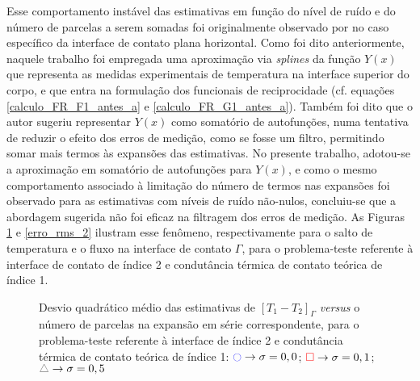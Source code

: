 Esse comportamento instável das estimativas em função do nível de ruído e do número de parcelas a serem somadas foi originalmente observado por \cite{tese_padilha} no caso específico da interface de contato plana horizontal. Como foi dito anteriormente, naquele trabalho foi empregada uma aproximação via \textit{splines} da função $Y(x)$ que representa as medidas experimentais de temperatura na interface superior do corpo, e que entra na formulação dos funcionais de reciprocidade (cf. equações \eqref{calculo_FR_F1_antes_a} e \eqref{calculo_FR_G1_antes_a}). Também foi dito que o autor sugeriu representar $Y(x)$ como somatório de autofunções, numa tentativa de reduzir o efeito dos erros de medição, como se fosse um filtro, permitindo somar mais termos às expansões das estimativas. No presente trabalho, adotou-se a aproximação em somatório de autofunções para $Y(x)$, e como o mesmo comportamento associado à limitação do número de termos nas expansões foi observado para as estimativas com níveis de ruído não-nulos, concluiu-se que a abordagem sugerida não foi eficaz na filtragem dos erros de medição. As Figuras \ref{erro_rms_1} e \ref{erro_rms_2} ilustram esse fenômeno, respectivamente para o salto de temperatura e o fluxo na interface de contato $\Gamma$, para o problema-teste referente à interface de contato de índice 2 e condutância térmica de contato teórica de índice 1.

\begin{figure}[H]
	\begin{minipage}[t][8cm][c]{\textwidth}
		\centering		
		\caption{Desvio quadrático médio das estimativas de $[T_1 - T_2]_\Gamma$ \textit{versus} o número de parcelas na expansão em série correspondente, para o problema-teste referente à interface de índice 2 e condutância térmica de contato teórica de índice 1: $\textcolor{blue}{\ocircle} \rightarrow \sigma = 0,0$; $\textcolor{red}{\square} \rightarrow \sigma = 0,1$; $\textcolor{gray}{\triangle} \rightarrow \sigma = 0,5$}
		\label{erro_rms_1}
	\end{minipage}
\end{figure}

